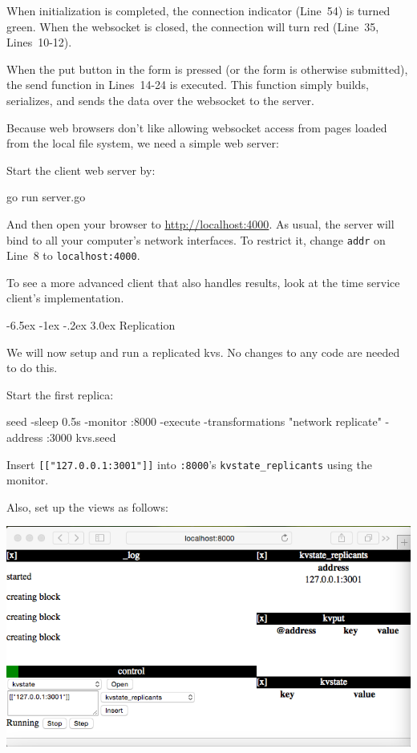 \documentclass[a5paper,12pt,onecolumn]{article}
\makeatletter
\def\code#1{\mbox{\lstinline{#1}}}
\renewcommand\section{\@startsection {section}{1}{\z@}%
	{-6.5ex \@plus -1ex \@minus -.2ex}%
	{3.0ex}%
	{\sf\Large}}
\makeatother
\begin{document}
When initialization is completed, the connection indicator (Line~54) is turned green. When the websocket is closed, the connection will turn red (Line~35, Lines~10-12).

When the put button in the form is pressed (or the form is otherwise submitted), the send function in Lines~14-24 is executed. This function simply builds, serializes, and sends the data over the websocket to the server.

Because web browsers don't like allowing websocket access from pages loaded from the local file system, we need a simple web server:



Start the client web server by:

\begin{cli}
go run server.go
\end{cli}

And then open your browser to \url{http://localhost:4000}. As usual, the server will bind to all your computer's network interfaces. To restrict it, change \code{addr} on Line~8 to \code{localhost:4000}.

To see a more advanced client that also handles results, look at the time service client's implementation.

\section{Replication}

We will now setup and run a replicated kvs. No changes to any code are needed to do this.

Start the first replica:

\begin{cli}
seed -sleep 0.5s -monitor :8000 -execute -transformations "network replicate" -address :3000 kvs.seed
\end{cli}

Insert \code{[["127.0.0.1:3001"]]} into \code{:8000}'s \code{kvstate_replicants} using the monitor.

Also, set up the views as follows:

\includegraphics{replicate/first.png}
\end{document}
